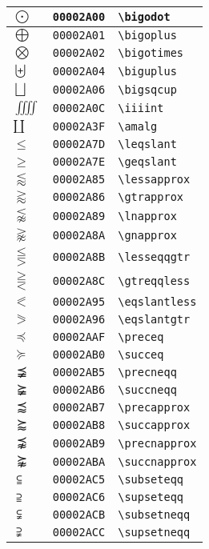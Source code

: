 \begin{longtable}{|l|l|l|}
\hline
$\bigodot$ & \texttt{00002A00} & \verb|\bigodot| \\
\hline
$\bigoplus$ & \texttt{00002A01} & \verb|\bigoplus| \\
\hline
$\bigotimes$ & \texttt{00002A02} & \verb|\bigotimes| \\
\hline
$\biguplus$ & \texttt{00002A04} & \verb|\biguplus| \\
\hline
$\bigsqcup$ & \texttt{00002A06} & \verb|\bigsqcup| \\
\hline
$\iiiint$ & \texttt{00002A0C} & \verb|\iiiint| \\
\hline
$\amalg$ & \texttt{00002A3F} & \verb|\amalg| \\
\hline
$\leqslant$ & \texttt{00002A7D} & \verb|\leqslant| \\
\hline
$\geqslant$ & \texttt{00002A7E} & \verb|\geqslant| \\
\hline
$\lessapprox$ & \texttt{00002A85} & \verb|\lessapprox| \\
\hline
$\gtrapprox$ & \texttt{00002A86} & \verb|\gtrapprox| \\
\hline
$\lnapprox$ & \texttt{00002A89} & \verb|\lnapprox| \\
\hline
$\gnapprox$ & \texttt{00002A8A} & \verb|\gnapprox| \\
\hline
$\lesseqqgtr$ & \texttt{00002A8B} & \verb|\lesseqqgtr| \\
\hline
$\gtreqqless$ & \texttt{00002A8C} & \verb|\gtreqqless| \\
\hline
$\eqslantless$ & \texttt{00002A95} & \verb|\eqslantless| \\
\hline
$\eqslantgtr$ & \texttt{00002A96} & \verb|\eqslantgtr| \\
\hline
$\preceq$ & \texttt{00002AAF} & \verb|\preceq| \\
\hline
$\succeq$ & \texttt{00002AB0} & \verb|\succeq| \\
\hline
$\precneqq$ & \texttt{00002AB5} & \verb|\precneqq| \\
\hline
$\succneqq$ & \texttt{00002AB6} & \verb|\succneqq| \\
\hline
$\precapprox$ & \texttt{00002AB7} & \verb|\precapprox| \\
\hline
$\succapprox$ & \texttt{00002AB8} & \verb|\succapprox| \\
\hline
$\precnapprox$ & \texttt{00002AB9} & \verb|\precnapprox| \\
\hline
$\succnapprox$ & \texttt{00002ABA} & \verb|\succnapprox| \\
\hline
$\subseteqq$ & \texttt{00002AC5} & \verb|\subseteqq| \\
\hline
$\supseteqq$ & \texttt{00002AC6} & \verb|\supseteqq| \\
\hline
$\subsetneqq$ & \texttt{00002ACB} & \verb|\subsetneqq| \\
\hline
$\supsetneqq$ & \texttt{00002ACC} & \verb|\supsetneqq| \\
\hline
\end{longtable}
